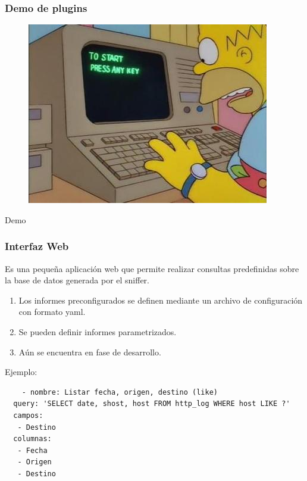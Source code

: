 \documentclass[10pt,a4paper]{beamer}
\begin{document}
\begin{frame}

	\frametitle{Demo de plugins}
	\begin{figure}[hbtp]
		\includegraphics[scale=0.4]{img/demo.jpg}
	\end{figure}
	\begin{center}
		\huge{Demo}
	\end{center}
	
\end{frame}

\begin{frame}[fragile]

	\frametitle{Interfaz Web}
	\begin{block}{}
		Es una pequeña aplicación web que permite realizar consultas predefinidas sobre la base de datos generada por el sniffer. 
	\end{block}
	
	\begin{enumerate}
		\item Los informes preconfigurados se definen mediante un archivo de configuración con formato yaml.
		\item Se pueden definir informes parametrizados.
		\item Aún se encuentra en fase de desarrollo.
	\end{enumerate}
	Ejemplo: 
	{\small
	\begin{verbatim}
	- nombre: Listar fecha, origen, destino (like)
  query: 'SELECT date, shost, host FROM http_log WHERE host LIKE ?'
  campos: 
   - Destino
  columnas:
   - Fecha
   - Origen
   - Destino

	\end{verbatim}
	}
	
\end{frame}
\end{document}
